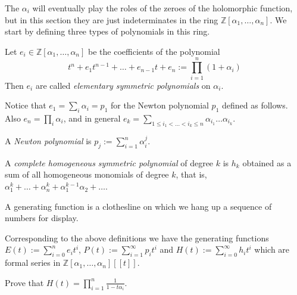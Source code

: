 \medskip\noindent
The $\alpha_i$ will eventually play the roles of the zeroes
of the holomorphic function, but in this section they are just
indeterminates in the ring $\mathbb{Z}[\alpha_1,\ldots,\alpha_n]$.
We start by defining three types of polynomials in this ring.

\begin{definition}
\label{definition-symmetric-polynomial}
Let $e_i \in \mathbb{Z}[\alpha_1,\ldots,\alpha_n]$ be the coefficients of the
polynomial 
$$
t^n+e_1t^{n-1}+\ldots+e_{n-1}t+e_n:=\prod_{i=1}^n(1+\alpha_i)
$$ Then $e_i$ are called {\it elementary
symmetric polynomials} on $\alpha_i$.
\end{definition}

\noindent
Notice that $e_1=\sum_i\alpha_i=p_1$ for the Newton polynomial $p_1$ defined as
follows. Also $e_n=\prod_{i}\alpha_i$, and in general $e_k=\sum_{1\leq
i_1<\ldots<i_k\leq n}\alpha_{i_1}\ldots\alpha_{i_k}$.

\begin{definition}
\label{definition-Newton-polynomial}
A {\it Newton polynomial} is $p_j:=\sum_{i=1}^n\alpha_i^j$.
\end{definition}

\begin{definition}
\label{definition-complete-homogeneous-symmetric-polynomial}
A {\it complete homogeneous symmetric polynomial} of degree $k$ is $h_k$
obtained as a sum of all homogeneous monomials of degree $k$, that is,
$\alpha_1^k+\ldots+\alpha_n^k+\alpha_1^{k-1}\alpha_2+\ldots$.
\end{definition}

\begin{slogan}
\begin{reference}
\cite[p. 1]{generatingfunctionology}
\end{reference}
A generating function is a clothesline on which we hang up a sequence of numbers
for display.
\end{slogan}

\noindent
Corresponding to the above definitions we have the generating functions 
$E(t):=\sum_{i=0}^ne_it^i$, $P(t):=\sum_{i=1}^\infty p_it^i$ and 
$H(t):=\sum_{i=0}^\infty h_it^i$ which are formal series in 
$\mathbb{Z}[\alpha_1,\ldots,\alpha_n][\![t]\!]$.

\begin{exercise}
\label{exercise-H}
Prove that $H(t)=\prod_{i=1}^n\frac{1}{1-t\alpha_i}$.
\end{exercise}

